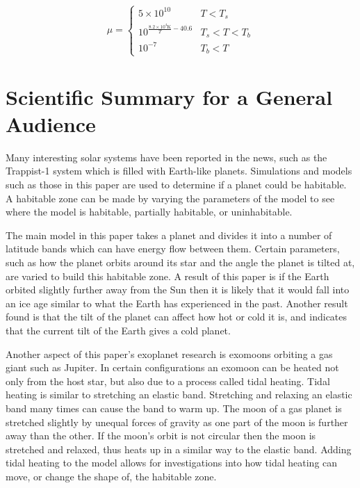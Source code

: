\documentclass[12pt, onecolumn]{revtex4-2}    %
\begin{document}
\begin{equation}
  \mu = 
  \begin{cases}
    5\times10^{10} & T < T_s \\
    10^{\frac{8.2\times10^4\text{K}}{T} - 40.6} & T_s < T < T_b \\
    10^{-7} & T_b < T
  \end{cases}
\end{equation}

\clearpage

\section*{Scientific Summary for a General Audience}

Many interesting solar systems have been reported in the news, such as the Trappist-1 system which is filled with Earth-like planets.
Simulations and models such as those in this paper are used to determine if a planet could be habitable.
A habitable zone can be made by varying the parameters of the model to see where the model is habitable, partially habitable, or uninhabitable.

The main model in this paper takes a planet and divides it into a number of latitude bands which can have energy flow between them.
Certain parameters, such as how the planet orbits around its star and the angle the planet is tilted at, are varied to build this habitable zone.
A result of this paper is if the Earth orbited slightly further away from the Sun then it is likely that it would fall into an ice age similar to what the Earth has experienced in the past.
Another result found is that the tilt of the planet can affect how hot or cold it is, and indicates that the current tilt of the Earth gives a cold planet.

Another aspect of this paper's exoplanet research is exomoons orbiting a gas giant such as Jupiter.
In certain configurations an exomoon can be heated not only from the host star, but also due to a process called tidal heating.
Tidal heating is similar to stretching an elastic band.
Stretching and relaxing an elastic band many times can cause the band to warm up.
The moon of a gas planet is stretched slightly by unequal forces of gravity as one part of the moon is further away than the other.
If the moon's orbit is not circular then the moon is stretched and relaxed, thus heats up in a similar way to the elastic band.
Adding tidal heating to the model allows for investigations into how tidal heating can move, or change the shape of, the habitable zone.
\end{document}
